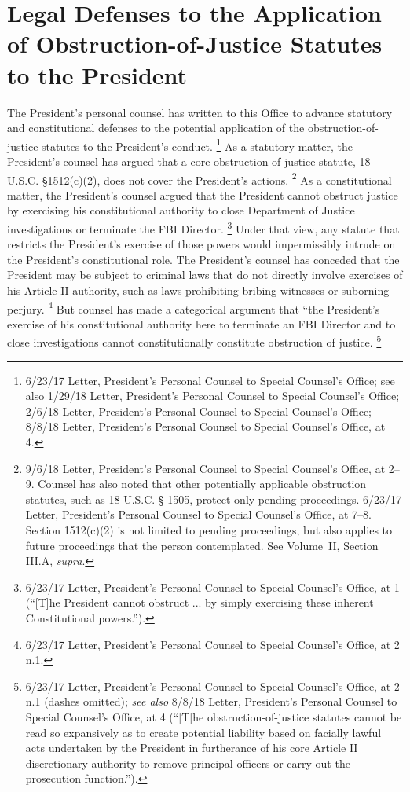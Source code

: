 \section{Legal Defenses to the Application of Obstruction-of-Justice Statutes to the President}

The President’s personal counsel has written to this Office to advance statutory and constitutional defenses to the potential application of the obstruction-of-justice statutes to the President’s conduct.%
\footnote{6/23/17 Letter, President’s Personal Counsel to Special Counsel’s Office;
see also 1/29/18 Letter, President’s Personal Counsel to Special Counsel’s Office;
2/6/18 Letter, President’s Personal Counsel to Special Counsel’s Office;
8/8/18 Letter, President’s Personal Counsel to Special Counsel’s Office, at 4.}
As a statutory matter, the President’s counsel has argued that a core obstruction-of-justice statute, 18 U.S.C. \S 1512(c)(2), does not cover the President’s actions.%
\footnote{9/6/18 Letter, President’s Personal Counsel to Special Counsel’s Office, at 2--9.
Counsel has also noted that other potentially applicable obstruction statutes, such as 18 U.S.C. § 1505, protect only pending proceedings.
6/23/17 Letter, President’s Personal Counsel to Special Counsel’s Office, at 7--8.
Section 1512(c)(2) is not limited to pending proceedings, but also applies to future proceedings that the person contemplated.
See Volume~II, Section III.A, \textit{supra}.}
As a constitutional matter, the President’s counsel argued that the President cannot obstruct justice by exercising his constitutional authority to close Department of Justice investigations or terminate the FBI Director.%
\footnote{6/23/17 Letter, President’s Personal Counsel to Special Counsel’s Office, at 1 (“[T]he President cannot obstruct ... by simply exercising these inherent Constitutional powers.”).}
Under that view, any statute that restricts the President’s exercise of those powers would impermissibly intrude on the President’s constitutional role.
The President’s counsel has conceded that the President may be subject to criminal laws that do not directly involve exercises of his Article II authority, such as laws prohibiting bribing witnesses or suborning perjury.%
\footnote{6/23/17 Letter, President’s Personal Counsel to Special Counsel’s Office, at 2 n.1.}
But counsel has made a categorical argument that “the President’s exercise of his constitutional authority here to terminate an FBI Director and to close investigations cannot constitutionally constitute obstruction of justice.%
\footnote{6/23/17 Letter, President’s Personal Counsel to Special Counsel’s Office, at 2 n.1 (dashes omitted);
\textit{see also} 8/8/18 Letter, President’s Personal Counsel to Special Counsel’s Office, at 4 (“[T]he obstruction-of-justice statutes cannot be read so expansively as to create potential liability based on facially lawful acts undertaken by the President in furtherance of his core Article II discretionary authority to remove principal officers or carry out the prosecution function.”).}

